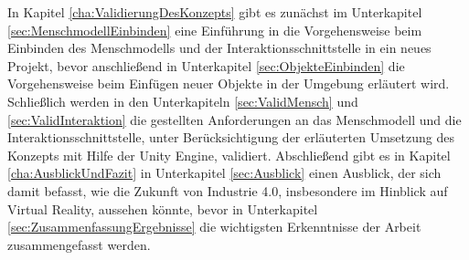 \newline
In Kapitel \ref{cha:ValidierungDesKonzepts} gibt es zunächst im Unterkapitel \ref{sec:MenschmodellEinbinden} eine Einführung in die Vorgehensweise beim Einbinden des Menschmodells und der Interaktionsschnittstelle in ein neues Projekt, bevor anschließend in Unterkapitel \ref{sec:ObjekteEinbinden} die Vorgehensweise beim Einfügen neuer Objekte in der Umgebung erläutert wird. Schließlich werden in den Unterkapiteln \ref{sec:ValidMensch} und \ref{sec:ValidInteraktion} die gestellten Anforderungen an das Menschmodell und die Interaktionsschnittstelle, unter Berücksichtigung der erläuterten Umsetzung des Konzepts mit Hilfe der Unity Engine, validiert.
\newline
Abschließend gibt es in Kapitel \ref{cha:AusblickUndFazit} in Unterkapitel \ref{sec:Ausblick} einen Ausblick, der sich damit befasst, wie die Zukunft von Industrie 4.0, insbesondere im Hinblick auf Virtual Reality, aussehen könnte, bevor in Unterkapitel \ref{sec:ZusammenfassungErgebnisse} die wichtigsten Erkenntnisse der Arbeit zusammengefasst werden.

